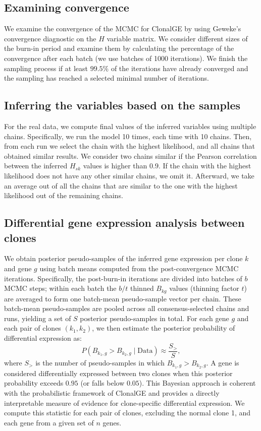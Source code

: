 \documentclass[unnumsec,webpdf,contemporary,large]{oup-authoring-template}%
\theoremstyle{thmstyleone}%
\theoremstyle{thmstyletwo}%
\theoremstyle{thmstylethree}%
\newcommand{\rev}[1]{{\color{revisionblue}#1}}
\begin{document}
\begin{methods}
\subsection*{Examining convergence }
We examine the convergence of the MCMC for ClonalGE by using  Geweke's convergence diagnostic on the $H$ variable matrix. We consider different sizes of the burn-in period and examine them by calculating the percentage of the convergence after each batch (we use batches of 1000 iterations). We finish the sampling process if at least $99.5\%$ of the iterations have already converged and the sampling has reached a selected minimal number of iterations.

\subsection*{Inferring the variables based on the samples}
For the real data, we compute final values of the inferred variables using multiple chains. Specifically, we run the model 10 times, each time with 10 chains. Then, from each run we select the chain with the highest likelihood, and all chains that obtained similar results. We consider two chains similar if the Pearson correlation between the inferred $H_{sk}$ values is higher than $0.9$. If the chain with the highest likelihood does not have any other similar chains, we omit it. Afterward, we take an average out of all the chains that are similar to the one with the highest likelihood out of the remaining chains.

\subsection*{Differential gene expression analysis between clones}
\rev{We obtain posterior pseudo-samples of the inferred gene expression per clone $k$ and gene $g$ using batch means computed from the post-convergence MCMC iterations. Specifically, the post-burn-in iterations are divided into batches of $b$ MCMC steps; within each batch the $b/t$ thinned $B_{kg}$ values (thinning factor $t$) are averaged to form one batch-mean pseudo-sample vector per chain. These batch-mean pseudo-samples are pooled across all consensus-selected chains and runs, yielding a set of $S$ posterior pseudo-samples in total. For each gene $g$ and each pair of clones $(k_1, k_2)$, we then estimate the posterior probability of differential expression as:
$$P(B_{k_1,g} > B_{k_2,g} \mid \text{Data}) \approx \frac{S_{>}}{S},$$
where $S_{>}$ is the number of pseudo-samples in which $B_{k_1,g} > B_{k_2,g}$. A gene is considered differentially expressed between two clones when this posterior probability exceeds $0.95$ (or falls below $0.05$). This Bayesian approach is coherent with the probabilistic framework of ClonalGE and provides a directly interpretable measure of evidence for clone-specific differential expression. We compute this statistic} for each pair of clones, excluding the normal clone 1, and each gene from a given set of $n$ genes.


\end{methods}
\end{document}
